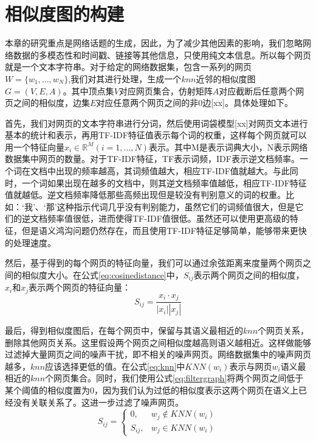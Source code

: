 \section{相似度图的构建}

本章的研究重点是网络话题的生成，因此，为了减少其他因素的影响，我们忽略网络数据的多模态性和时间戳、链接等其他信息，只使用纯文本信息。所以每个网页就是一个文本字符串。对于给定的网络数据集，包含一系列的网页$W=\{w_1,...,w_N\}$,我们对其进行处理，生成一个$knn$近邻的相似度图$G=(V,E,A)$。其中顶点集$V$对应网页集合，仿射矩阵$A$对应截断后任意两个网页之间的相似度，边集$E$对应任意两个网页之间的非$0$边[xx]。具体处理如下。

首先，我们对网页的文本字符串进行分词，然后使用词袋模型[xx]对网页文本进行基本的统计和表示，再用TF-IDF特征值表示每个词的权重，这样每个网页就可以用一个特征向量$x_i\in \mathbb{R}^M(i=1,...,N)$表示。其中M是表示词典大小，N表示网络数据集中网页的数量。对于TF-IDF特征，TF表示词频，IDF表示逆文档频率。一个词在文档中出现的频率越高，其词频值越大，相应TF-IDF值就越大。与此同时，一个词如果出现在越多的文档中，则其逆文档频率值越低，相应TF-IDF特征值就越低。逆文档频率降低那些高频出现但是较没有判别意义的词的权重。比如：‘我’、‘那’这种指示代词几乎没有判别能力，虽然它们的词频值很大，但是它们的逆文档频率值很低，进而使得TF-IDF值很低。虽然还可以使用更高级的特征，但是语义鸿沟问题仍然存在，而且使用TF-IDF特征足够简单，能够带来更快的处理速度。

然后，基于得到的每个网页的特征向量，我们可以通过余弦距离来度量两个网页之间的相似度大小。在公式\ref{eq:cosinedistance}中，$S_{ij}$表示两个网页之间的相似度，$x_i$和$x_j$表示两个网页的特征向量：
\begin{equation}\label{eq:cosinedistance}
    S_{ij} = \frac{x_i\cdot x_j}{|x_i||x_j|}
\end{equation}

最后，得到相似度图后，在每个网页中，保留与其语义最相近的$knn$个网页关系，删除其他网页关系。这里假设两个网页之间相似度越高则语义越相近。这样做能够过滤掉大量网页之间的噪声干扰，即不相关的噪声网页。网络数据集中的噪声网页越多，$knn$应该选择更低的值。在公式\ref{eq:knn}中$KNN(w_i)$表示与网页$w_i$语义最相近的$knn$个网页集合。同时，我们使用公式\ref{eq:filtergraph}将两个网页之间低于某个阈值的相似度置为$0$，因为我们认为过低的相似度表示这两个网页在语义上已经没有关联关系了。这进一步过滤了噪声网页。
\begin{equation}\label{eq:knn}
S_{ij} = 
\begin{cases}
0, &  w_j \notin KNN(w_i) \\
S_{ij}, & w_j \in KNN(w_i)
\end{cases}
\end{equation}

